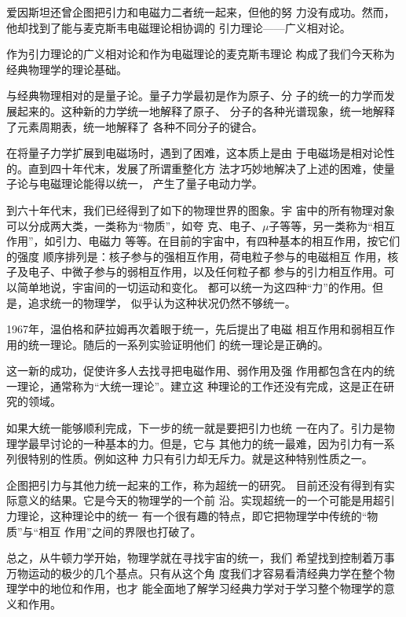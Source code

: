 爱因斯坦还曾企图把引力和电磁力二者统一起来，但他的努
力没有成功。然而，他却找到了能与麦克斯韦电磁理论相协调的
引力理论——广义相对论。

作为引力理论的广义相对论和作为电磁理论的麦克斯韦理论
构成了我们今天称为经典物理学的理论基础。

与经典物理相对的是量子论。量子力学最初是作为原子、分
子的统一的力学而发展起来的。这种新的力学统一地解释了原子、
分子的各种光谱现象，统一地解释了元素周期表，统一地解释了
各种不同分子的键合。

在将量子力学扩展到电磁场时，遇到了困难，这本质上是由
于电磁场是相对论性的。直到四十年代末，发展了所谓重整化方
法才巧妙地解决了上述的困难，使量子论与电磁理论能得以统一，
产生了量子电动力学。

到六十年代末，我们已经得到了如下的物理世界的图象。宇
宙中的所有物理对象可以分成两大类，一类称为“物质”，如夸
克、电子、$\mu$子等等，另一类称为“相互作用”，如引力、电磁力
等等。在目前的宇宙中，有四种基本的相互作用，按它们的强度
顺序排列是：核子参与的强相互作用，荷电粒子参与的电磁相互
作用，核子及电子、中微子参与的弱相互作用，以及任何粒子都
参与的引力相互作用。可以简单地说，宇宙间的一切运动和变化。
都可以统一为这四种“力”的作用。但是，追求统一的物理学，
似乎认为这种状况仍然不够统一。

1967年，温伯格和萨拉姆再次着眼于统一，先后提出了电磁
相互作用和弱相互作用的统一理论。随后的一系列实验证明他们
的统一理论是正确的。

这一新的成功，促使许多人去找寻把电磁作用、弱作用及强
作用都包含在内的统一理论，通常称为“大统一理论”。建立这
种理论的工作还没有完成，这是正在研究的领域。

如果大统一能够顺利完成，下一步的统一就是要把引力也统
一在内了。引力是物理学最早讨论的一种基本的力。但是，它与
其他力的统一最难，因为引力有一系列很特别的性质。例如这种
力只有引力却无斥力。就是这种特别性质之一。

企图把引力与其他力统一起来的工作，称为超统一的研究。
目前还没有得到有实际意义的结果。它是今天的物理学的一个前
沿。实现超统一的一个可能是用超引力理论，这种理论中的统一
有一个很有趣的特点，即它把物理学中传统的“物质”与“相互
作用”之间的界限也打破了。

总之，从牛顿力学开始，物理学就在寻找宇宙的统一，我们
希望找到控制着万事万物运动的极少的几个基点。只有从这个角
度我们才容易看清经典力学在整个物理学中的地位和作用，也才
能全面地了解学习经典力学对于学习整个物理学的意义和作用。
